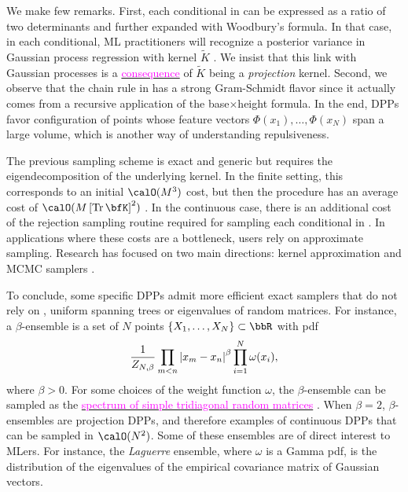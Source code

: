   We make few remarks.
  First, each conditional in  can be expressed as a ratio of two determinants and further expanded with Woodbury's formula.
  In that case, in each conditional, ML practitioners will recognize  a posterior variance in Gaussian process regression with kernel $\tilde K$ \cite[Equation 2.26]{RaWi06}.
  We insist that this link with Gaussian processes is a \href{https://dppy.readthedocs.io/en/latest/finite_dpps/exact_sampling.html#caution}{\textcolor{magenta}{consequence}} of $\tilde K$ being a \emph{projection} kernel.
  Second, we observe that the chain rule in  has a strong Gram-Schmidt flavor since it actually comes from a recursive application of the base$\times$height formula.
  In the end, DPPs favor configuration of points whose feature vectors $\Phi(x_1),\dots, \Phi(x_N)$ span a large volume, which is another way of understanding repulsiveness.

  The previous sampling scheme is exact and generic but requires the eigendecomposition of the underlying kernel.
  In the finite setting, this corresponds to an initial $\calO(M^3)$ cost, but then the procedure has an average cost of $\calO(M\lrb{\Tr \bfK}^2)$
  \citep{TrBaAm18}.
  In the continuous case, there is an additional cost of the rejection sampling routine required for sampling each conditional in .
  In applications where these costs are a bottleneck, users rely on approximate sampling.
  Research has focused on two main directions: kernel approximation \citep{AKFT13} and MCMC samplers \citep{AnGhRe16, LiJeSr16c, GaBaVa17}.

  To conclude, some specific DPPs admit more efficient exact samplers that do not rely on , \eg uniform spanning trees \citep{PrWi98} or eigenvalues of random matrices.
  For instance, a $\beta$-ensemble is a set of $N$ points $\{X_1,\dots,X_N\}\subset \bbR$ with pdf
  \begin{equation*}
  \label{eq:beta_ensemble_pdf}
    \frac{1}{Z_{N,\beta}}
    \prod_{m< n}
      \left| x_m-x_n \right|^{\beta}
    \prod_{i= 1}^N
      \omega(x_i),
  \end{equation*}
  where $\beta>0$.
  For some choices of the weight function $\omega$, the $\beta$-ensemble can be sampled as the \href{https://dppy.readthedocs.io/en/latest/continuous_dpps/beta_ensembles.banded_models.html}{\textcolor{magenta}{spectrum of simple tridiagonal random matrices}} \citep{DuEd02,KiNe04}.
  When $\beta=2$, $\beta$-ensembles are projection DPPs, and therefore examples of continuous DPPs that can be sampled in $\calO(N^2)$.
  Some of these ensembles are of direct interest to MLers.
  For instance, the \emph{Laguerre} ensemble, where $\omega$ is a Gamma pdf, is the distribution of the eigenvalues of the empirical covariance matrix of \iid Gaussian vectors.

